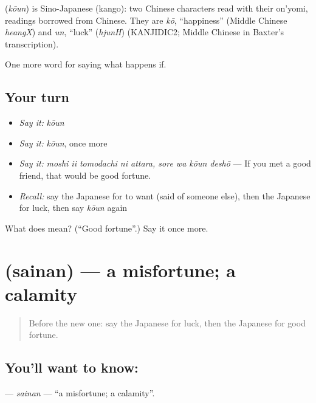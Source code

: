 \begin{cousinweb}
\textbf{} (\emph{kōun}) is Sino-Japanese (kango): two Chinese characters read with their on'yomi, readings borrowed from Chinese. They are \emph{kō}, \textquotedblleft{}happiness\textquotedblright{} (Middle Chinese \emph{heangX}) and \emph{un}, \textquotedblleft{}luck\textquotedblright{} (\emph{hjunH}) (KANJIDIC2; Middle Chinese in Baxter's transcription).
\end{cousinweb}

\begin{grammarlens}[title={What you've built}]
One more word for saying what happens if.
\end{grammarlens}

\subsection*{Your turn}
\begin{itemize}
\raggedright
  \item \emph{Say it:} \emph{kōun}
  \item \emph{Say it:} \emph{kōun}, once more
  \item \emph{Say it:} \emph{moshi ii tomodachi ni attara, sore wa kōun deshō} — If you met a good friend, that would be good fortune.
  \item \emph{Recall:} say the Japanese for to want (said of someone else), then the Japanese for luck, then say \emph{kōun} again
\end{itemize}

\begin{tcolorbox}[breakable,colback=teal!4,colframe=teal!35!black,title={Before you move on}]
What does  mean? (\textquotedblleft{}Good fortune\textquotedblright{}.) Say it once more.
\end{tcolorbox}
\section[\texorpdfstring{\ja{さいなん} (sainan)}{さいなん (sainan)}]{ (sainan) — a misfortune; a calamity}

\label{lesson:JA-C508-sainan}



\begin{quote}
Before the new one: say the Japanese for luck, then the Japanese for good fortune.
\end{quote}

\subsection*{You'll want to know: }
\textbf{} — \emph{sainan} — \textquotedblleft{}a misfortune; a calamity\textquotedblright{}.


